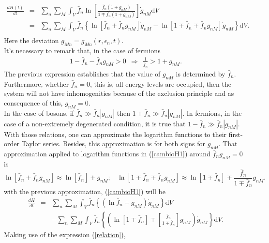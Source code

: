 \documentclass{article}
\begin{document}
\begin{eqnarray}
    \frac{dH(t)}{dt}&=&\sum_n \sum_M \int_V\bar{f}_{n}\ln \left[ \frac{\bar{f}_{n}(1+g_{nM})}{1\mp \bar{f}_{n} (1+ g_{nM})} \right]\dot{g}_{nM}\mathrm{d}V \nonumber \\
    &=&\sum_n \sum_M \int_V\bar{f}_n \left \{ \ln [\bar{f}_n+\bar{f}_n g_{nM}]\dot{g}_{nM}-\ln [1\mp\bar{f}_n\mp\bar{f}_n g_{nM}]\dot{g}_{nM}  \right \}\mathrm{d}V.\nonumber \\
    \label{cambioH1}
\end{eqnarray}{}
Here the deviation $g_{Mn}=g_{Mn}(\bar{r},\epsilon_{n},t)$.\\
It's necessary to remark that, in the case of fermions
\begin{eqnarray}
   1-\bar f_n -\bar f_n g_{nM}>0 \ \ \Rightarrow \ \ \frac{1}{\bar f_n}>1+g_{nM}.
\end{eqnarray}{}
The previous expression establishes that the value of $g_{nM}$ is determined by $\bar f_n$. Furthermore, whether $\bar f_{n}=0$, this is, all energy levels are occupied, then the system will not have inhomogenities because of the exclusion principle and as consequence of this,  $g_{nM}=0$.\\
In the case of bosons, if $\bar{f}_n \gg \bar{f}_n |g_{nM}|$ then $1+\bar{f}_n \gg \bar{f}_n |g_{nM}|$. In fermions, in the case of a non-extremely degenerated condition, it is true that $1-\bar{f}_n \gg \bar{f}_n |g_{nM}|$. With those relations, one can approximate the logarithm functions to their first-order Taylor series. Besides, this approximation is for both signs for $g_{nM}$.
That approximation applied to logarithm functions in (\ref{cambioH1}) around $\bar f_n g_{nM}=0$ is
\begin{equation}
    \ln [\bar{f}_n+\bar{f}_n g_{nM}] \approx \ln [\bar{f}_n]+ g_{nM}; \ \ \ \ \ln[1\mp\bar{f}_n\mp\bar{f}_n g_{nM}] \approx \ln[1\mp\bar{f}_n]\mp\frac{\bar{f}_n}{1\mp\bar{f}_{n}} g_{nM}. \label{lnapproximation}
\end{equation}{}
with the previous approximation, (\ref{cambioH1}) will be
\begin{eqnarray}
    \frac{dH}{dt}&=&\sum_n \sum_M \int_V\bar{f}_n\left \{ (\ln \bar{f}_n+ g_{nM})\dot{g}_{nM}\right\}\mathrm{d}V \nonumber \\
    &&-\sum_{n}\sum_{M}\int_V\bar f_n\left\{ \left( \ln[1\mp\bar{f}_n]\mp \left[\frac{\bar{f}_n}{1\mp\bar{f}_n} \right] g_{nM}\right)\dot{g}_{nM} \right \}\mathrm{d}V.\label{cambioH2}
\end{eqnarray}{}
Making use of the expression (\ref{relation}),
\end{document}
